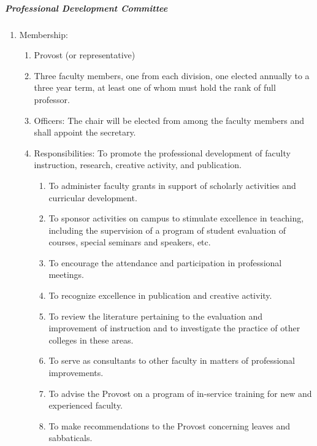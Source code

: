 \documentclass[letterpaper, 11pt]{article}
\begin{document}
				\subparagraph{Professional Development Committee}
					\begin{enumerate}[label=\alph*)]
						\item{Membership:
							\begin{enumerate}[label=\arabic*)]
								\item{Provost (or representative)}
								\item{Three faculty members, one from each division, one elected annually to a three year term, at least one of whom must hold the rank of full professor.}
								\item{Officers:
									The chair will be elected from among the faculty members and shall appoint the secretary.}
								\item{Responsibilities:
									To promote the professional development of faculty instruction, research, creative activity, and publication.
									\begin{enumerate}[label=\arabic*)]
										\item{To administer faculty grants in support of scholarly activities and curricular development.}
										\item{To sponsor activities on campus to stimulate excellence in teaching, including the supervision of a program of student evaluation of courses, special seminars and speakers, etc.}
										\item{To encourage the attendance and participation in professional meetings.}
										\item{To recognize excellence in publication and creative activity.}
										\item{To review the literature pertaining to the evaluation and improvement of instruction and to investigate the practice of other colleges in these areas.}
										\item{To serve as consultants to other faculty in matters of professional improvements.}
										\item{To advise the Provost on a program of in-service training for new and experienced faculty.}
										\item{To make recommendations to the Provost concerning leaves and sabbaticals.}
									\end{enumerate}
								}
							\end{enumerate}
						}
					\end{enumerate}
\end{document}
